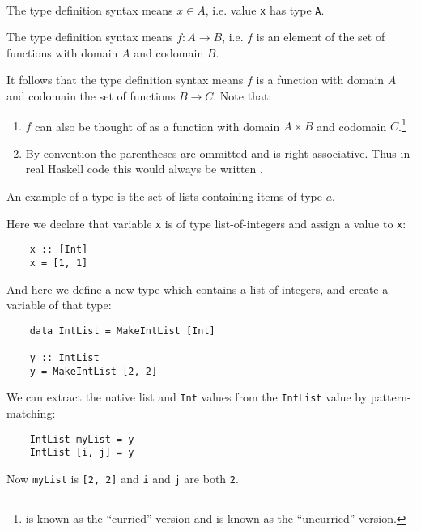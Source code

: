 \documentclass[12pt]{article}
\begin{document}
\begin{comment}
  \begin{remark*}
    The type is defined at compile time. The elements of the set are data values (including functions) that exist at run time.
  \end{remark*}
\end{comment}

\begin{notation*}\hspace{0pt}\\
  The type definition syntax  means $x \in A$, i.e. value {\tt x} has type {\tt A}.

  The type definition syntax  means $f:A \to B$, i.e. $f$ is an element of the set
  of functions with domain $A$ and codomain $B$.
\end{notation*}

\begin{remark*}
  It follows that the type definition syntax  means $f$ is a function with
  domain $A$ and codomain the set of functions $B \to C$. Note that:
  \begin{enumerate}
  \item $f$ can also be thought of as a function with domain $A \times B$ and codomain
    $C$.\footnote{ is known as the ``curried'' version and  is
      known as the ``uncurried'' version.}
  \item By convention the parentheses are ommitted and \mih{->} is right-associative. Thus in real
    Haskell code this would always be written .
  \end{enumerate}

\end{remark*}

\begin{example*}
  An example of a type is the set of lists containing items of type $a$.

  Here we declare that variable {\tt x} is of type list-of-integers and assign a value to
  {\tt x}:
  \begin{verbatim}
    x :: [Int]
    x = [1, 1]
  \end{verbatim}

  And here we define a new type which contains a list of integers, and create a variable of
  that type:
  \begin{verbatim}
    data IntList = MakeIntList [Int]

    y :: IntList
    y = MakeIntList [2, 2]
  \end{verbatim}

  We can extract the native list and {\tt Int} values from the {\tt IntList} value by pattern-matching:
  \begin{verbatim}
    IntList myList = y
    IntList [i, j] = y
  \end{verbatim}
  Now {\tt myList} is {\tt  [2, 2]} and {\tt i} and {\tt j} are both {\tt 2}.

\end{example*}
\end{document}
